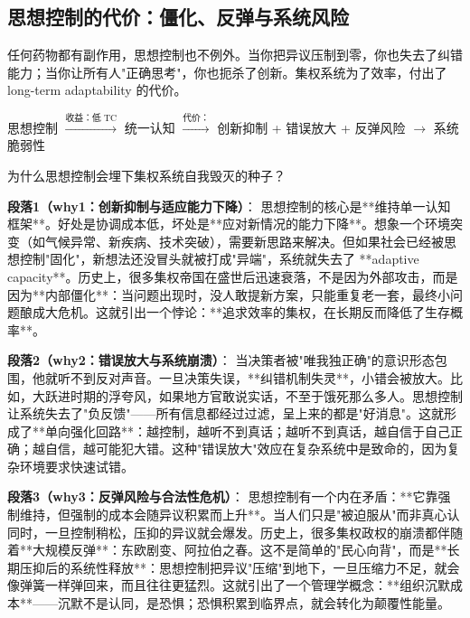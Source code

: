 \documentclass[openany, a4paper, 12pt]{book}
\newenvironment{logicmap}{
	\begin{tcolorbox}[
		colback=blue!5!white,      %
		colframe=blue!50!black,    %
		title=\textbf{逻辑地图 (Logic Map)}, %
		fonttitle=\bfseries,
		sharp corners=south,       %
		boxrule=0.5mm
		]
	\centering
	}{
	\end{tcolorbox}
}
\newenvironment{motivation}{
	\vspace{0.5em}
	\begin{tcolorbox}[
		colback=gray!10,           %
		colframe=gray!60,          %
		title=\textit{本章动机 (Motivation)},
		fonttitle=\bfseries,
		arc=0mm,                   %
		leftrule=3mm               %
		]
		\small \itshape %
	}{
	\end{tcolorbox}
	\vspace{1em}
}
\begin{document}
	\subsection{思想控制的代价：僵化、反弹与系统风险}
	
	\begin{motivation}
		任何药物都有副作用，思想控制也不例外。当你把异议压制到零，你也失去了纠错能力；当你让所有人"正确思考"，你也扼杀了创新。集权系统为了效率，付出了 long-term adaptability 的代价。
	\end{motivation}
	
	\begin{logicmap}
		思想控制 $\xrightarrow{\text{收益：低 TC}}$ 统一认知 $\xrightarrow{\text{代价：}}$ 创新抑制 + 错误放大 + 反弹风险 $\rightarrow$ 系统脆弱性
	\end{logicmap}
	
	\begin{questionbox}
		为什么思想控制会埋下集权系统自我毁灭的种子？
	\end{questionbox}
	
	\textbf{段落1（why1：创新抑制与适应能力下降）}：  
	思想控制的核心是**维持单一认知框架**。好处是协调成本低，坏处是**应对新情况的能力下降**。想象一个环境突变（如气候异常、新疾病、技术突破），需要新思路来解决。但如果社会已经被思想控制"固化"，新想法还没冒头就被打成"异端"，系统就失去了 **adaptive capacity**。历史上，很多集权帝国在盛世后迅速衰落，不是因为外部攻击，而是因为**内部僵化**：当问题出现时，没人敢提新方案，只能重复老一套，最终小问题酿成大危机。这就引出一个悖论：**追求效率的集权，在长期反而降低了生存概率**。
	
	\textbf{段落2（why2：错误放大与系统崩溃）}：  
	当决策者被"唯我独正确"的意识形态包围，他就听不到反对声音。一旦决策失误，**纠错机制失灵**，小错会被放大。比如，大跃进时期的浮夸风，如果地方官敢说实话，不至于饿死那么多人。思想控制让系统失去了"负反馈"——所有信息都经过过滤，呈上来的都是"好消息"。这就形成了**单向强化回路**：越控制，越听不到真话；越听不到真话，越自信于自己正确；越自信，越可能犯大错。这种"错误放大"效应在复杂系统中是致命的，因为复杂环境要求快速试错。
	
	\textbf{段落3（why3：反弹风险与合法性危机）}：  
	思想控制有一个内在矛盾：**它靠强制维持，但强制的成本会随异议积累而上升**。当人们只是"被迫服从"而非真心认同时，一旦控制稍松，压抑的异议就会爆发。历史上，很多集权政权的崩溃都伴随着**大规模反弹**：东欧剧变、阿拉伯之春。这不是简单的"民心向背"，而是**长期压抑后的系统性释放**：思想控制把异议"压缩"到地下，一旦压缩力不足，就会像弹簧一样弹回来，而且往往更猛烈。这就引出了一个管理学概念：**组织沉默成本**——沉默不是认同，是恐惧；恐惧积累到临界点，就会转化为颠覆性能量。
	
\end{document}
